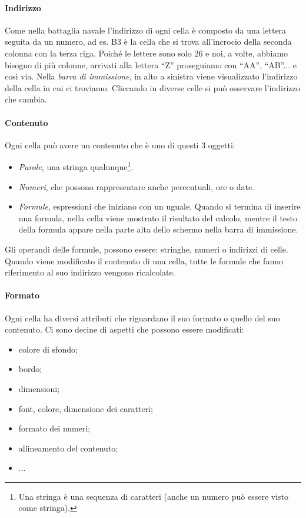 \paragraph{Indirizzo}

Come nella battaglia navale l'indirizzo di ogni cella è composto da una
lettera seguita da un numero, ad es. B3 è la cella che si trova all'incrocio
della seconda colonna con la terza riga. Poiché le lettere sono solo 26 e
noi, a volte, abbiamo bisogno di più colonne, arrivati alla lettera ``Z''
proseguiamo con ``AA'', ``AB''... e così via.
Nella \emph{barra di immissione}, in alto a sinistra viene visualizzato
l'indirizzo della cella in cui ci troviamo.
Cliccando in diverse celle si può osservare l'indirizzo che cambia.

\paragraph{Contenuto}

Ogni cella può avere un contenuto che è uno di questi 3 oggetti:

\begin{itemize} [noitemsep]
\item 
\emph{Parole}, una stringa qualunque\footnote{Una stringa è una sequenza di 
caratteri (anche un numero può essere visto come stringa).}.
\item 
\emph{Numeri}, che possono rappresentare anche percentuali, ore o date.
\item 
\emph{Formule}, espressioni che iniziano con un uguale. Quando si termina di
inserire una formula, nella cella viene mostrato il risultato del calcolo,
mentre il testo della formula appare nella parte alta dello schermo nella
barra di immissione.
\end{itemize}

Gli operandi delle formule, possono essere: stringhe,  numeri o indirizzi di 
celle.
Quando viene modificato il contenuto di una cella, tutte
le formule che fanno riferimento al suo indirizzo vengono ricalcolate.

\paragraph{Formato}

Ogni cella ha diversi attributi che riguardano il suo formato o quello del
suo contenuto.
Ci sono decine di aspetti che possono essere modificati:

\begin{itemize} [noitemsep]
\item colore di sfondo;
\item bordo;
\item dimensioni;
\item font, colore, dimensione dei caratteri;
\item formato dei numeri;
\item allineamento del contenuto;
\item ...
\end{itemize}

